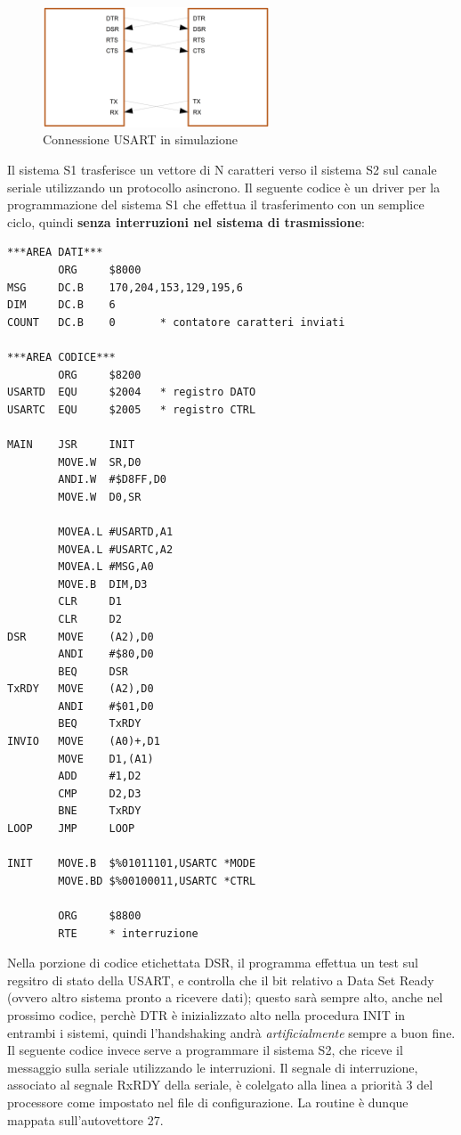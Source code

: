 \begin{figure}[ht]
    \centering
    \includegraphics[width=0.6\textwidth]{img/USART_NOMODEM.png}
    \caption{Connessione USART in simulazione}
    \label{img:USART_connect}
\end{figure}

Il sistema S1 trasferisce un vettore di N caratteri verso il sistema S2 sul canale seriale utilizzando un protocollo asincrono. 
Il seguente codice è un driver per la programmazione del sistema S1 che effettua il trasferimento con un semplice ciclo, quindi \textbf{senza interruzioni nel sistema di trasmissione}:

\begin{lstlisting}
***AREA DATI***
        ORG     $8000
MSG     DC.B    170,204,153,129,195,6
DIM     DC.B    6
COUNT   DC.B    0       * contatore caratteri inviati 

***AREA CODICE*** 
        ORG     $8200
USARTD  EQU     $2004   * registro DATO 
USARTC  EQU     $2005   * registro CTRL 

MAIN    JSR     INIT
        MOVE.W  SR,D0 
        ANDI.W  #$D8FF,D0
        MOVE.W  D0,SR

        MOVEA.L #USARTD,A1 
        MOVEA.L #USARTC,A2 
        MOVEA.L #MSG,A0 
        MOVE.B  DIM,D3 
        CLR     D1
        CLR     D2 
DSR     MOVE    (A2),D0
        ANDI    #$80,D0
        BEQ     DSR 
TxRDY   MOVE    (A2),D0 
        ANDI    #$01,D0 
        BEQ     TxRDY 
INVIO   MOVE    (A0)+,D1
        MOVE    D1,(A1)
        ADD     #1,D2 
        CMP     D2,D3 
        BNE     TxRDY 
LOOP    JMP     LOOP 

INIT    MOVE.B  $%01011101,USARTC *MODE 
        MOVE.BD $%00100011,USARTC *CTRL 

        ORG     $8800 
        RTE     * interruzione

\end{lstlisting}

Nella porzione di codice etichettata DSR, il programma effettua un test sul regsitro di stato della USART, e controlla che il bit relativo a Data Set Ready (ovvero altro sistema pronto a ricevere dati); questo sarà sempre alto, anche nel prossimo codice, perchè DTR è inizializzato alto nella procedura INIT in entrambi i sistemi, quindi l'handshaking andrà \textit{artificialmente} sempre a buon fine. 
Il seguente codice invece serve a programmare il sistema S2, che riceve il messaggio sulla seriale utilizzando le interruzioni. Il segnale di interruzione, associato al segnale RxRDY della seriale, è colelgato alla linea a priorità 3 del processore come impostato nel file di configurazione. La routine è dunque mappata sull'autovettore 27.

